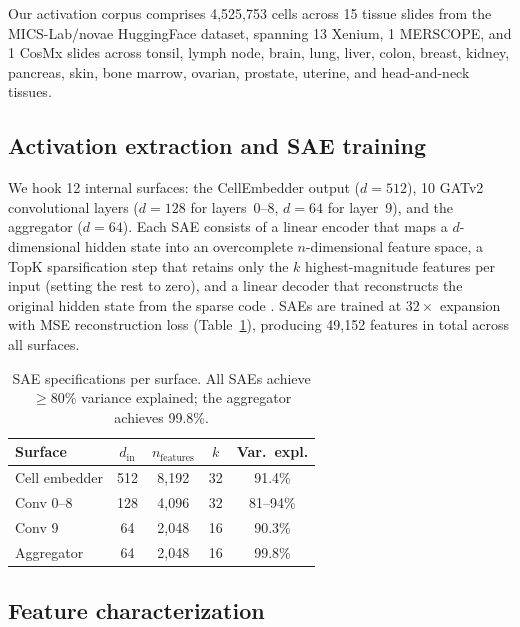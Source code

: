 \documentclass[11pt]{article}
\begin{document}
Our activation corpus comprises 4{,}525{,}753 cells across 15
tissue slides from the MICS-Lab/novae HuggingFace dataset, spanning
13 Xenium, 1 MERSCOPE, and 1 CosMx slides across tonsil, lymph
node, brain, lung, liver, colon, breast, kidney, pancreas, skin,
bone marrow, ovarian, prostate, uterine, and head-and-neck tissues.

\subsection{Activation extraction and SAE training}

We hook 12 internal surfaces: the CellEmbedder output ($d=512$),
10 GATv2 convolutional layers ($d=128$ for layers~0--8, $d=64$ for
layer~9), and the aggregator ($d=64$). Each SAE consists of a linear
encoder that maps a $d$-dimensional hidden state into an overcomplete
$n$-dimensional feature space, a TopK sparsification step that retains
only the $k$ highest-magnitude features per input (setting the rest to
zero), and a linear decoder that reconstructs the original hidden state
from the sparse code \citep{gao2024,makhzani2014}. SAEs are trained at
$32\times$ expansion with MSE reconstruction loss
(Table~\ref{tab:sae_specs}), producing 49{,}152 features in total
across all surfaces.

\begin{table}[ht]
\centering
\caption{SAE specifications per surface. All SAEs achieve $\geq$80\%
variance explained; the aggregator achieves 99.8\%.}
\label{tab:sae_specs}
\begin{tabular}{lcccc}
\toprule
Surface & $d_\text{in}$ & $n_\text{features}$ & $k$ & Var.\ expl. \\
\midrule
Cell embedder & 512 & 8{,}192 & 32 & 91.4\% \\
Conv 0--8 & 128 & 4{,}096 & 32 & 81--94\% \\
Conv 9 & 64 & 2{,}048 & 16 & 90.3\% \\
Aggregator & 64 & 2{,}048 & 16 & 99.8\% \\
\bottomrule
\end{tabular}
\end{table}

\subsection{Feature characterization}
\end{document}
